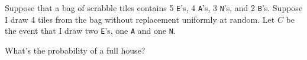 \documentclass[addpoints,12pt]{exam}
\begin{document}
\begin{questions}
\begin{parts}
\vspace{1.5in}

\end{parts}

\question[2] Suppose that a bag of scrabble tiles contains 5 \texttt{E}'s, 4 \texttt{A}'s, 3 \texttt{N}'s, and 2 \texttt{B}'s. Suppose I draw 4 tiles from the bag without replacement uniformly at random. Let $C$ be the event that I draw two \texttt{E}'s, one \texttt{A} and one \texttt{N}.

\noaddpoints
{}

\question[1] What's the probability of a full house?
\end{questions}
\end{document}
